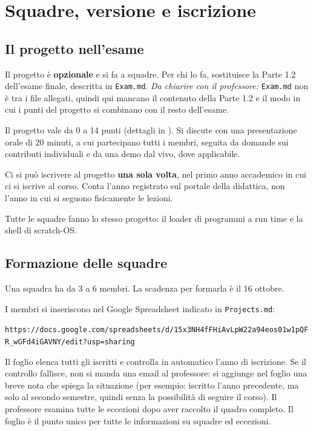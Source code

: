 \section{Squadre, versione e iscrizione}

\subsection{Il progetto nell'esame}

Il progetto è \textbf{opzionale} e si fa a squadre. Per chi lo fa, sostituisce la Parte 1.2 dell'esame finale, descritta in \texttt{Exam.md}. \emph{Da chiarire con il professore:} \texttt{Exam.md} non è tra i file allegati, quindi qui mancano il contenuto della Parte 1.2 e il modo in cui i punti del progetto si combinano con il resto dell'esame.

Il progetto vale da 0 a 14 punti (dettagli in ). Si discute con una presentazione orale di 20 minuti, a cui partecipano tutti i membri, seguita da domande sui contributi individuali e da una demo dal vivo, dove applicabile.

Ci si può iscrivere al progetto \textbf{una sola volta}, nel primo anno accademico in cui ci si iscrive al corso. Conta l'anno registrato sul portale della didattica, non l'anno in cui si seguono fisicamente le lezioni.

Tutte le squadre fanno lo stesso progetto: il loader di programmi a run time e la shell di scratch-OS.

\subsection{Formazione delle squadre}

Una squadra ha da 3 a 6 membri. La scadenza per formarla è il 16 ottobre.

I membri si inseriscono nel Google Spreadsheet indicato in \texttt{Projects.md}:
\begin{center}
\small\texttt{https://docs.google.com/spreadsheets/d/\allowbreak 15x3NH4fFHiAvLpW22a94eos01w1pQFR\_wGFd4iGAVNY/\allowbreak edit?usp=sharing}
\end{center}

Il foglio elenca tutti gli iscritti e controlla in automatico l'anno di iscrizione. Se il controllo fallisce, non si manda una email al professore: si aggiunge nel foglio una breve nota che spiega la situazione (per esempio: iscritto l'anno precedente, ma solo al secondo semestre, quindi senza la possibilità di seguire il corso). Il professore esamina tutte le eccezioni dopo aver raccolto il quadro completo. Il foglio è il punto unico per tutte le informazioni su squadre ed eccezioni.

